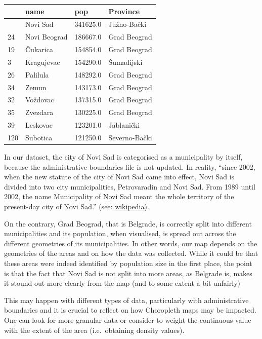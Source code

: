 \documentclass[
  letterpaper,
  DIV=11,
  numbers=noendperiod]{scrreprt}
\begin{document}
\begin{longtable}[]{@{}llll@{}}
\toprule\noalign{}
& name & pop & Province \\
\midrule\noalign{}
\endhead
\bottomrule\noalign{}
\endlastfoot
48 & Novi Sad & 341625.0 & Južno-Bački \\
24 & Novi Beograd & 186667.0 & Grad Beograd \\
19 & Čukarica & 154854.0 & Grad Beograd \\
3 & Kragujevac & 154290.0 & Šumadijski \\
26 & Palilula & 148292.0 & Grad Beograd \\
34 & Zemun & 143173.0 & Grad Beograd \\
32 & Voždovac & 137315.0 & Grad Beograd \\
35 & Zvezdara & 130225.0 & Grad Beograd \\
39 & Leskovac & 123201.0 & Jablanički \\
120 & Subotica & 121250.0 & Severno-Bački \\
\end{longtable}

In our dataset, the city of Novi Sad is categorised as a municipality by
itself, because the administrative boundaries file is not updated. In
reality, ``since 2002, when the new statute of the city of Novi Sad came
into effect, Novi Sad is divided into two city municipalities,
Petrovaradin and Novi Sad. From 1989 until 2002, the name Municipality
of Novi Sad meant the whole territory of the present-day city of Novi
Sad.'' (see:
\href{https://en.wikipedia.org/wiki/City_municipality_of_Novi_Sad}{wikipedia}).

On the contrary, Grad Beograd, that is Belgrade, is correctly split into
different municipalities and its population, when visualised, is spread
out across the different geometries of its municipalities. In other
words, our map depends on the geometries of the areas and on how the
data was collected. While it could be that these areas were indeed
identified by population size in the first place, the point is that the
fact that Novi Sad is not split into more areas, as Belgrade is, makes
it stound out more clearly from the map (and to some extent a bit
unfairly)

This may happen with different types of data, particularly with
administrative boundaries and it is crucial to reflect on how Choropleth
maps may be impacted. One can look for more granular data or consider to
weight the continuous value with the extent of the area (i.e.~obtaining
density values).
\end{document}
